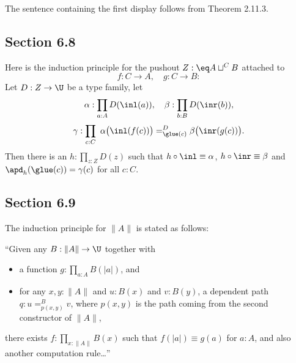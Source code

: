\documentclass[12pt]{article}
\begin{document}
The sentence containing the first display follows from Theorem 2.11.3.


\subsection{Section 6.8}

Here is the induction principle for the pushout $Z:\eq A\sqcup^CB$ attached to 
$$
f:C\to A,\quad g:C\to B:
$$ 
Let $D:Z\to\U$ be a type family, let 
$$
\alpha:\prod_{a:A}D(\inl(a)),\quad\beta:\prod_{b:B}D(\inr(b)),
$$
$$
\gamma:\prod_{c:C}\ \alpha\big(\inl(f(c))\big)=^D_{\glue(c)}\beta\big(\inr(g(c))\big).
$$ 
Then there is an $h:\prod_{z:Z}D(z)$ such that $h\circ \inl\equiv\alpha$, $h\circ \inr\equiv\beta$ and $\apd_h(\glue(c))=\gamma(c)$ for all $c:C$. 




\subsection{Section 6.9}

The induction principle for $\lVert A\rVert$ is stated as follows:

\nn``Given any $B:\lVert A\rVert\to\U$ together with
\begin{itemize}
\item a function $g:\prod_{a:A}B(\lvert a\rvert)$, and
\item for any $x,y:\lVert A\rVert$ and $u:B(x)$ and $v:B(y)$, a dependent path $q:u=^B_{p(x,y)}v$, where $p(x,y)$ is the path coming from the second constructor of $\lVert A\rVert$,
\end{itemize}
there exists $f:\prod_{x:\lVert A\rVert}B(x)$ such that $f(\lvert a\rvert)\equiv g(a)$ for $a:A$, and also another computation rule\dots''
\end{document}
